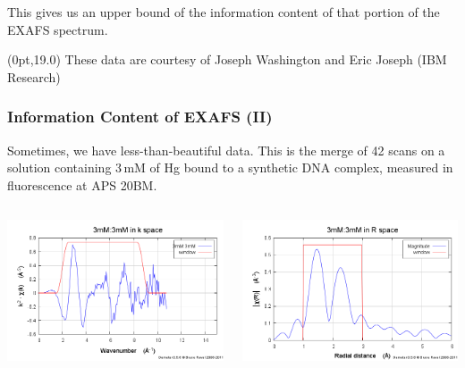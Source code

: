 \documentclass[10pt, xcolor=x11names, compress]{beamer}
\begin{document}
\begin{frame}
  ~\\[-7ex]
  ~

  \begin{exampleblock}{}
    \begin{center}
      This gives us an upper bound of the information content of that
      portion of the EXAFS spectrum.
    \end{center}
  \end{exampleblock}
  \begin{textblock*}{0.4\linewidth}(0pt,19.0\TPVertModule)%
    \tiny%
    These data are courtesy of Joseph Washington and Eric
    Joseph (IBM Research)
  \end{textblock*}
\end{frame}

\begin{frame}
  \frametitle{Information Content of EXAFS (II)}
  \small
  Sometimes, we have less-than-beautiful data.  This is the merge of 42
  scans on a solution containing 3\,mM of Hg bound to a synthetic DNA
  complex, measured in fluorescence at APS 20BM.
  \begin{columns}
    \begin{column}{0.5\linewidth}
      \begin{center}
        \includegraphics[width=0.8\linewidth]{info/hgdna_chik.png}
      \end{center}
    \end{column}
    \begin{column}{0.5\linewidth}
      \begin{center}
        \includegraphics[width=0.8\linewidth]{info/hgdna_chir.png}

\end{center}
\end{column}
\end{columns}
\end{frame}
\end{document}
